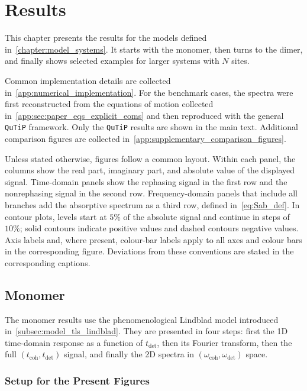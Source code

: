 \chapter{Results}
\label{chapter:results}

This chapter presents the results for the models defined in~\autoref{chapter:model_systems}. It starts with the monomer, then turns to the dimer, and finally shows selected examples for larger systems with \(N\) sites.

Common implementation details are collected in~\autoref{app:numerical_implementation}. For the benchmark cases, the spectra were first reconstructed from the equations of motion collected in~\autoref{app:sec:paper_eqs_explicit_eoms} and then reproduced with the general \texttt{QuTiP} framework. Only the \texttt{QuTiP} results are shown in the main text. Additional comparison figures are collected in~\autoref{app:supplementary_comparison_figures}.

Unless stated otherwise, figures follow a common layout.
Within each panel, the columns show the real part, imaginary part, and absolute
value of the displayed signal. Time-domain panels show the rephasing signal in
the first row and the nonrephasing signal in the second row. Frequency-domain
panels that include all branches add the absorptive spectrum as a third row,
defined in~\autoref{eq:Sab_def}. In contour plots, levels start at \(5\%\) of
the absolute signal and continue in steps of \(10\%\); solid contours indicate
positive values and dashed contours negative values. Axis labels and, where
present, colour-bar labels apply to all axes and colour bars in the
corresponding figure. Deviations from these
conventions are stated in the corresponding captions.

\section{Monomer}
\label{sec:results_monomer}
The monomer results use the phenomenological Lindblad model introduced in~\autoref{subsec:model_tls_lindblad}. They are presented in four steps: first the 1D time-domain response as a function of \(t_{\mathrm{det}}\), then its Fourier transform, then the full \((t_{\mathrm{coh}},t_{\mathrm{det}})\) signal, and finally the 2D spectra in \((\omega_{\mathrm{coh}},\omega_{\mathrm{det}})\) space.

\subsection{Setup for the Present Figures}
\label{subsec:results_monomer_model}

